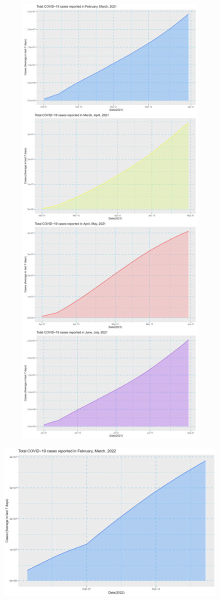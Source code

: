 \documentclass[a4paper]{article}
\theoremstyle{definition}
\begin{document}
\begin{enumerate}[i)]
\begin{enumerate}[1)]
\begin{figure}[H]
				\includegraphics[height=23cm,width=13cm]{images/8.5.2.png}
			\end{figure}
			\begin{figure}[H]
				\centering
				\includegraphics[scale=0.2]{images/8.5.3.png}

\end{figure}
\end{enumerate}
\end{enumerate}
\end{document}
